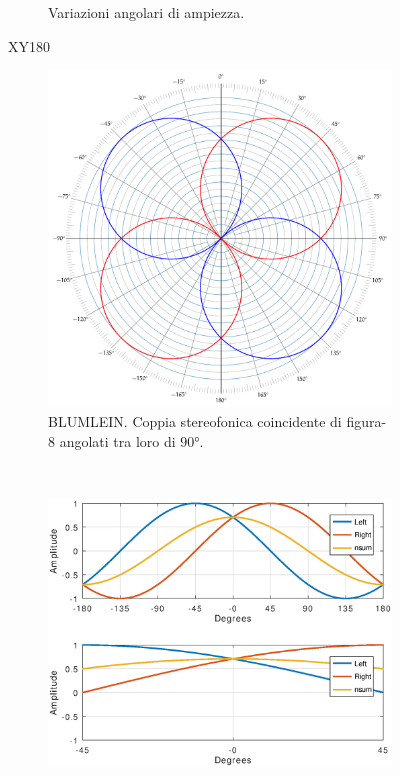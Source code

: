 \begin{figure}[t]
\begin{subfigure}[t]{0.99\textwidth}
        \caption{Variazioni angolari di ampiezza.}%
        \label{plot:xy180}
    \end{subfigure}
    \caption{XY180}
    \label{sp:xy180}
\end{figure}

\clearpage

\begin{figure}[t]
    \centering
    \begin{subfigure}[t]{0.99\textwidth}
        \centering
        \includegraphics[width=11cm]{CAPITOLI/_TIKZ/POLAR/blumlein}
        \caption{BLUMLEIN. Coppia stereofonica coincidente di figura-8 angolati tra loro di $90°$.}%
        \label{pol:blumleinsp}
    \end{subfigure}%
    \\
    \begin{subfigure}[t]{0.99\textwidth}
        \centering
        \includegraphics[width=12.5cm]{CAPITOLI/1000/IMG/blumleinsub}

\end{subfigure}
\end{figure}

